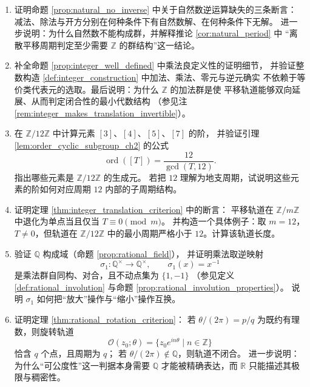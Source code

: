 \begin{enumerate}[leftmargin=3em, label=\textbf{题 \arabic*}]
    \item 证明命题 \ref{prop:natural_no_inverse} 中关于自然数逆运算缺失的三条断言：
    减法、除法与开方分别在何种条件下有自然数解、在何种条件下无解。
    进一步说明：为什么自然数不能构成群，并解释推论 \ref{cor:natural_period} 中
    “离散平移周期判定至少需要 $\mathbb{Z}$ 的群结构”这一结论。

    \item 补全命题 \ref{prop:integer_well_defined} 中乘法良定义性的证明细节，
    并验证整数构造 \ref{def:integer_construction} 中加法、乘法、零元与逆元确实
    不依赖于等价类代表元的选取。最后说明：为什么 $\mathbb{Z}$ 的加法群是使
    平移轨道能够双向延展、从而判定闭合性的最小代数结构
    （参见注 \ref{rem:integer_makes_translation_invertible}）。

    \item 在 $\mathbb{Z}/12\mathbb{Z}$ 中计算元素 $[3]$、$[4]$、$[5]$、$[7]$ 的阶，
    并验证引理 \ref{lem:order_cyclic_subgroup_ch2} 的公式
    \[
    \operatorname{ord}([T])=\frac{12}{\gcd(T,12)}.
    \]
    指出哪些元素是 $\mathbb{Z}/12\mathbb{Z}$ 的生成元。
    若把 $12$ 理解为地支周期，试说明这些元素的阶如何对应周期 $12$ 内部的子周期结构。

    \item 证明定理 \ref{thm:integer_translation_criterion} 中的断言：
    平移轨道在 $\mathbb{Z}/m\mathbb{Z}$ 中退化为单点当且仅当 $T\equiv0\pmod m$。
    并构造一个具体例子：取 $m=12$，$T\neq0$，但轨道在 $\mathbb{Z}/12\mathbb{Z}$
    中的最小周期严格小于 $12$。计算该轨道长度。

    \item 验证 $\mathbb{Q}$ 构成域（命题 \ref{prop:rational_field}），
    并证明乘法取逆映射
    \[
    \sigma_1:\mathbb{Q}^{\times}\to\mathbb{Q}^{\times},\qquad
    \sigma_1(x)=x^{-1}
    \]
    是乘法群自同构、对合，且不动点集为 $\{1,-1\}$
    （参见定义 \ref{def:rational_involution} 与命题 \ref{prop:rational_involution_properties}）。
    说明 $\sigma_1$ 如何把“放大”操作与“缩小”操作互换。

    \item 证明定理 \ref{thm:rational_rotation_criterion}：
    若 $\theta/(2\pi)=p/q$ 为既约有理数，则旋转轨道
    \[
    \mathcal{O}(z_0;\theta)=\{z_0e^{in\theta}\mid n\in\mathbb{Z}\}
    \]
    恰含 $q$ 个点，且周期为 $q$；
    若 $\theta/(2\pi)\notin\mathbb{Q}$，则轨道不闭合。
    进一步说明：为什么“可公度性”这一判据本身需要 $\mathbb{Q}$
    才能被精确表达，而 $\mathbb{R}$ 只能描述其极限与稠密性。


\end{enumerate}

